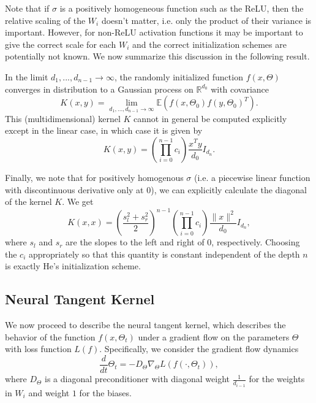 Note that if $\sigma$ is a positively homogeneous function such as the ReLU, then the relative scaling of the $W_i$ doesn't matter, i.e. only the product of their variance is important. However, for non-ReLU activation functions it may be important to give the correct scale for each $W_i$ and the correct initialization schemes are potentially not known. We now summarize this discussion in the following result.
\begin{theorem}
 In the limit $d_1,...,d_{n-1}\rightarrow \infty$, the randomly initialized function $f(x,\Theta)$ converges in distribution to a Gaussian process on $\mathbb{R}^{d_0}$ with covariance
 \begin{equation}
  K(x,y) = \lim_{d_1,...,d_{n-1}\rightarrow \infty} \mathbb{E}(f(x,\Theta_0)f(y,\Theta_0)^T).
 \end{equation}
 This (multidimensional) kernel $K$ cannot in general be computed explicitly except in the linear case, in which case it is given by
 \begin{equation}
  K(x,y) = \left(\prod_{i=0}^{n-1} c_i\right)\frac{x^Ty}{d_0}I_{d_n}.
 \end{equation}

\end{theorem}
Finally, we note that for positively homogenous $\sigma$ (i.e. a piecewise linear function with discontinuous derivative only at $0$), we can explicitly calculate the diagonal of the kernel $K$. We get
\begin{equation}
 K(x,x) = \left(\frac{s_l^2 + s_r^2}{2}\right)^{n-1}\left(\prod_{i=0}^{n-1} c_i\right)\frac{\|x\|^2}{d_0}I_{d_n},
\end{equation}
where $s_l$ and $s_r$ are the slopes to the left and right of $0$, respectively. Choosing the $c_i$ appropriately so that this quantity is constant independent of the depth $n$ is exactly He's initialization scheme.

\subsection{Neural Tangent Kernel}
We now proceed to describe the neural tangent kernel, which describes the behavior of the function $f(x,\Theta_t)$ under a gradient flow on the parameters $\Theta$ with loss function $L(f)$. Specifically, we consider the gradient flow dynamics
\begin{equation}
 \frac{d}{dt}\Theta_t = -D_\Theta\nabla_\Theta L(f(\cdot, \Theta_t)),
\end{equation}
where $D_\Theta$ is a diagonal preconditioner with diagonal weight $\frac{1}{d_{i-1}}$ for the weights in $W_i$ and weight $1$ for the biases.

